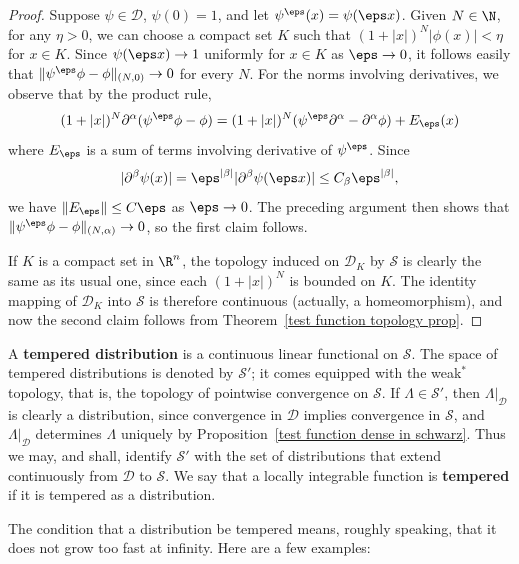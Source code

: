 \begin{proof}
Suppose $\psi\in\mathscr{D}$, $\psi(0)=1$, and let $\psi^\eps(x)=\psi(\eps x)$. Given $N\in\N$, for any $\eta>0$, we can choose a compact set $K$ such that $(1+|x|)^N|\phi(x)|<\eta$ for $x\in K$. Since $\psi(\eps x)\to 1$ uniformly for $x\in K$ as $\eps\to 0$, it follows easily that $\|\psi^\eps\phi-\phi\|_{(N,0)}\to 0$ for every $N$. For the norms involving derivatives, we observe that by the product rule,
\[(1+|x|)^N\partial^\alpha(\psi^\eps\phi-\phi)=(1+|x|)^N(\psi^\eps\partial^\alpha-\partial^\alpha\phi)+E_\eps(x)\]
where $E_\eps$ is a sum of terms involving derivative of $\psi^\eps$. Since
\[|\partial^\beta\psi(x)|=\eps^{|\beta|}|\partial^\beta\psi(\eps x)|\leq C_\beta\eps^{|\beta|},\]
we have $\|E_\eps\|\leq C\eps$ as $\eps\to 0$. The preceding argument then shows that $\|\psi^\eps\phi-\phi\|_{(N,\alpha)}\to 0$, so the first claim follows.\par
If $K$ is a compact set in $\R^n$, the topology induced on $\mathscr{D}_K$ by $\mathscr{S}$ is clearly the same as its usual one, since each $(1+|x|)^N$ is bounded on $K$. The identity mapping of $\mathscr{D}_K$ into $\mathscr{S}$ is therefore continuous (actually, a homeomorphism), and now the second claim follows from Theorem~\ref{test function topology prop}.
\end{proof}
A \textbf{tempered distribution} is a continuous linear functional on $\mathscr{S}$. The space of tempered distributions is denoted by $\mathscr{S}'$; it comes equipped with the weak$^*$ topology, that is, the topology of pointwise convergence on $\mathscr{S}$. If $\Lambda\in\mathscr{S}'$, then $\Lambda|_{\mathscr{D}}$ is clearly a distribution, since convergence in $\mathscr{D}$ implies convergence in $\mathscr{S}$, and $\Lambda|_{\mathscr{D}}$ determines $\Lambda$ uniquely by Proposition~\ref{test function dense in schwarz}. Thus we may, and shall, identify $\mathscr{S}'$ with the set of distributions that extend continuously from $\mathscr{D}$ to $\mathscr{S}$. We say that a locally integrable function is \textbf{tempered} if it is tempered as a distribution.\par
The condition that a distribution be tempered means, roughly speaking, that it does not grow too fast at infinity. Here are a few examples:
